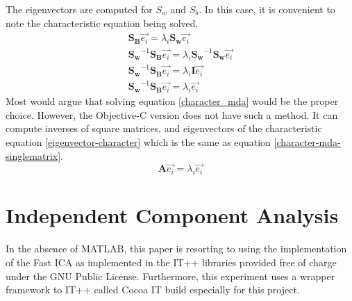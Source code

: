 \documentclass[12pt]{report}
\begin{document}
The eigenvectors are computed for $S_w$ and $S_b$. In this case, it is convenient to note the characteristic equation being solved.
\begin{eqnarray}
\mathbf{S_B}\vec{e_i} = \lambda_i \mathbf{S_w}\vec{e_i} \label{character_mda}\\
\mathbf{S_w}^{-1}\mathbf{S_B}\vec{e_i} = \lambda_i \mathbf{S_w}^{-1} \mathbf{S_w}\vec{e_i} \\
\mathbf{S_w}^{-1}\mathbf{S_B}\vec{e_i} = \lambda_i \mathbf{I} \vec{e_i} \\
\mathbf{S_w}^{-1}\mathbf{S_B}\vec{e_i} = \lambda_i \vec{e_i} \label{character-mda-singlematrix}
\end{eqnarray}
Most would argue that solving equation \ref{character_mda} would be the proper choice.  However, the Objective-C version does not have such a method.  It can compute inverses of square matrices, and eigenvectors of the characteristic equation \ref{eigenvector-character} which is the same as equation \ref{character-mda-singlematrix}.
\begin{equation}
\mathbf{A} \vec{e_i} = \lambda_i \vec{e_i} \label{eigenvector-character}
\end{equation}

\section{Independent Component Analysis}

In the absence of MATLAB, this paper is resorting to using the implementation of the Fast ICA as implemented in the IT++ libraries provided free of charge under the GNU Public License.  Furthermore, this experiment uses a wrapper framework to IT++ called Cocoa IT build especially for this project.  
\end{document}
